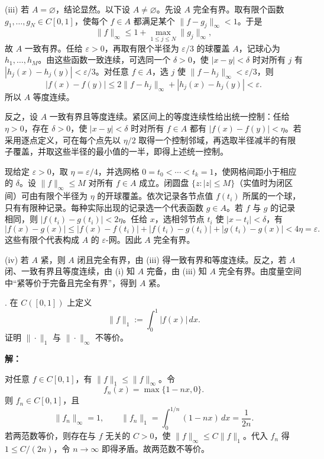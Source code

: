 \documentclass{article}
\begin{document}
(iii) 若 $A=\varnothing$，结论显然。以下设 $A\ne\varnothing$。先设 $A$ 完全有界。取有限个函数 $g_1,\ldots,g_N\in C[0,1]$，使每个 $f\in A$ 都满足某个 $\|f-g_j\|_\infty<1$。于是
\[
\|f\|_\infty\le1+\max_{1\le j\le N}\|g_j\|_\infty,
\]
故 $A$ 一致有界。任给 $\varepsilon>0$，再取有限个半径为 $\varepsilon/3$ 的球覆盖 $A$，记球心为 $h_1,\ldots,h_M$。由这些函数一致连续，可选同一个 $\delta>0$，使 $|x-y|<\delta$ 时对所有 $j$ 有 $|h_j(x)-h_j(y)|<\varepsilon/3$。对任意 $f\in A$，选 $j$ 使 $\|f-h_j\|_\infty<\varepsilon/3$，则
\[
|f(x)-f(y)|\le2\|f-h_j\|_\infty+|h_j(x)-h_j(y)|<\varepsilon.
\]
所以 $A$ 等度连续。

反之，设 $A$ 一致有界且等度连续。紧区间上的等度连续性给出统一控制：任给 $\eta>0$，存在 $\delta>0$，使 $|x-y|<\delta$ 时对所有 $f\in A$ 都有 $|f(x)-f(y)|<\eta$。若采用逐点定义，可在每个点先以 $\eta/2$ 取得一个控制邻域，再选取半径减半的有限子覆盖，并取这些半径的最小值的一半，即得上述统一控制。

现给定 $\varepsilon>0$，取 $\eta=\varepsilon/4$，并选网格 $0=t_0<\cdots<t_k=1$，使网格间距小于相应的 $\delta$。设 $\|f\|_\infty\le M$ 对所有 $f\in A$ 成立。闭圆盘 $\{z:|z|\le M\}$（实值时为闭区间）可由有限个半径为 $\eta$ 的开球覆盖。依次记录各节点值 $f(t_i)$ 所属的一个球，只有有限种记录。每种实际出现的记录选一个代表函数 $g\in A$。若 $f$ 与 $g$ 的记录相同，则 $|f(t_i)-g(t_i)|<2\eta$。任给 $x$，选相邻节点 $t_i$ 使 $|x-t_i|<\delta$，有
\[
|f(x)-g(x)|\le|f(x)-f(t_i)|+|f(t_i)-g(t_i)|+|g(t_i)-g(x)|<4\eta=\varepsilon.
\]
这些有限个代表构成 $A$ 的 $\varepsilon$-网。因此 $A$ 完全有界。

(iv) 若 $A$ 紧，则 $A$ 闭且完全有界，由 (iii) 得一致有界和等度连续。反之，若 $A$ 闭、一致有界且等度连续，由 (i) 知 $A$ 完备，由 (iii) 知 $A$ 完全有界。由度量空间中“紧等价于完备且完全有界”，得到 $A$ 紧。


\par\medskip{}. 在 $C([0,1])$ 上定义
\[
\|f\|_1:=\int_0^1|f(x)|\,dx.
\]
证明 $\|\cdot\|_1$ 与 $\|\cdot\|_\infty$ 不等价。


\par{}\noindent\textbf{解：}\par\nopagebreak[4]



对任意 $f\in C[0,1]$，有 $\|f\|_1\le\|f\|_\infty$。令
\[
f_n(x)=\max\{1-nx,0\}.
\]
则 $f_n\in C[0,1]$，且
\[
\|f_n\|_\infty=1,\qquad
\|f_n\|_1=\int_0^{1/n}(1-nx)\,dx=\frac1{2n}.
\]
若两范数等价，则存在与 $f$ 无关的 $C>0$，使 $\|f\|_\infty\le C\|f\|_1$。代入 $f_n$ 得 $1\le C/(2n)$，令 $n\to\infty$ 即得矛盾。故两范数不等价。
\end{document}
